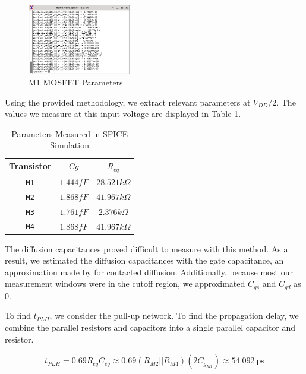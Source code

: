 \documentclass[fleqn]{article}
\begin{document}
	\begin{figure}[H]
		\centerline{\includegraphics[width=0.4\textwidth]{nand_eq_params_sweep_va_vb.png}}
		\caption{M1 MOSFET Parameters}			\label{fig::nand_eq_params_sweep_va_vb}
	\end{figure}
	
	Using the provided methodology, we extract relevant parameters at $V_{DD}/2$. The values we measure at this input voltage are displayed in Table \ref{table::nand_gate_eq_params}.
	
	\begin{table}[H]
	\begin{center}
	\caption{Parameters Measured in SPICE Simulation}
	\label{table::nand_gate_eq_params}
	\begin{tabular}{| c | c | c |}
		\hline
		Transistor & $Cg$ & $R_{eq}$ \\
		\hline	
		\texttt{M1} & $1.444fF$ & $28.521k\Omega$ \\
		\hline
		\texttt{M2} & $1.868fF$ & $41.967k\Omega$ \\
		\hline
		\texttt{M3} & $1.761fF$ & $2.376k\Omega$ \\
		\hline
		\texttt{M4} & $1.868fF$ & $41.967k\Omega$ \\
		\hline
	\end{tabular}	
	\end{center}
	\end{table}
	
	\noindent The diffusion capacitances proved difficult to measure with this method. As a result, we estimated the diffusion capacitances with the gate capacitance, an approximation made by \cite{cmos_vlsi_design} for contacted diffusion. Additionally, because most our measurement windows were in the cutoff region, we approximated $C_{gs}$ and $C_{gd}$ as 0. 
	
	To find $t_{PLH}$, we consider the pull-up network. To find the propagation delay, we combine the parallel resistors and capacitors into a single parallel capacitor and resistor.
	
	\begin{equation}
		t_{PLH} = 0.69R_{eq}C_{eq} \approx 0.69(R_{M2}||R_{M4})(2C_{g_{M1}}) \approx 54.092\ \text{ps}
	\end{equation}
	
\end{document}
